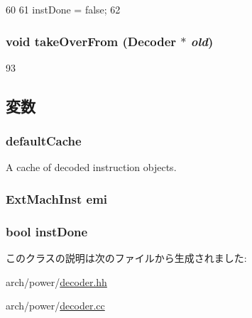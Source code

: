 \begin{DoxyCode}
60     {
61         instDone = false;
62     }
\end{DoxyCode}
\hypertarget{classPowerISA_1_1Decoder_a83393f90e7cbd98eda9721ba6022d0e0}{
\subsubsection[{takeOverFrom}]{\setlength{\rightskip}{0pt plus 5cm}void takeOverFrom ({\bf Decoder} $\ast$ {\em old})}}
\label{classPowerISA_1_1Decoder_a83393f90e7cbd98eda9721ba6022d0e0}



\begin{DoxyCode}
93 {}
\end{DoxyCode}


\subsection{変数}
\hypertarget{classPowerISA_1_1Decoder_a8800313f93afe356e1177866068cc8d6}{
\subsubsection[{defaultCache}]{ {\bf defaultCache}}}
\label{classPowerISA_1_1Decoder_a8800313f93afe356e1177866068cc8d6}


A cache of decoded instruction objects. \hypertarget{classPowerISA_1_1Decoder_abf211faf305b89c9093b00b6b82b0bd1}{
\subsubsection[{emi}]{\setlength{\rightskip}{0pt plus 5cm}ExtMachInst {\bf emi}}}
\label{classPowerISA_1_1Decoder_abf211faf305b89c9093b00b6b82b0bd1}
\hypertarget{classPowerISA_1_1Decoder_a37c5d55785204b8fd00a8ebf62e1fc33}{
\subsubsection[{instDone}]{\setlength{\rightskip}{0pt plus 5cm}bool {\bf instDone}}}
\label{classPowerISA_1_1Decoder_a37c5d55785204b8fd00a8ebf62e1fc33}


このクラスの説明は次のファイルから生成されました:\begin{DoxyCompactItemize}
\item 
arch/power/\hyperlink{power_2decoder_8hh}{decoder.hh}\item 
arch/power/\hyperlink{power_2decoder_8cc}{decoder.cc}\end{DoxyCompactItemize}
